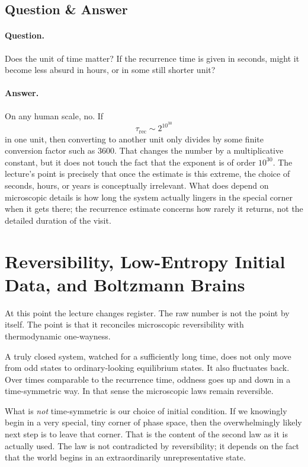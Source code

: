 \subsection{Question \& Answer}

\paragraph{Question.} Does the unit of time matter? If the recurrence time is given in seconds, might it become less absurd in hours, or in some still shorter unit?

\paragraph{Answer.} On any human scale, no. If
\begin{equation}
\tau_{\mathrm{rec}} \sim 2^{10^{30}}
\end{equation}
in one unit, then converting to another unit only divides by some finite conversion factor such as \(3600\). That changes the number by a multiplicative constant, but it does not touch the fact that the exponent is of order \(10^{30}\). The lecture's point is precisely that once the estimate is this extreme, the choice of seconds, hours, or years is conceptually irrelevant. What does depend on microscopic details is how long the system actually lingers in the special corner when it gets there; the recurrence estimate concerns how rarely it returns, not the detailed duration of the visit.

\section{Reversibility, Low-Entropy Initial Data, and Boltzmann Brains}

At this point the lecture changes register. The raw number is not the point by itself. The point is that it reconciles microscopic reversibility with thermodynamic one-wayness.

A truly closed system, watched for a sufficiently long time, does not only move from odd states to ordinary-looking equilibrium states. It also fluctuates back. Over times comparable to the recurrence time, oddness goes up and down in a time-symmetric way. In that sense the microscopic laws remain reversible.

What is \emph{not} time-symmetric is our choice of initial condition. If we knowingly begin in a very special, tiny corner of phase space, then the overwhelmingly likely next step is to leave that corner. That is the content of the second law as it is actually used. The law is not contradicted by reversibility; it depends on the fact that the world begins in an extraordinarily unrepresentative state.

